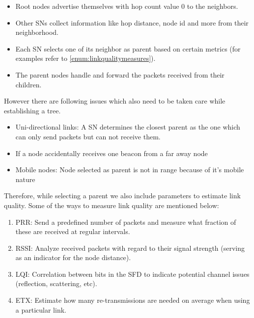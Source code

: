 \begin{itemize}
    \item Root nodes advertise themselves with hop count value 0 to the neighbors.
    \item Other \acp{SN} collect information like hop distance, node id and more from their neighborhood.
    \item Each \ac{SN} selects one of its neighbor as parent based on certain metrics (for examples refer to \ref{enum:linkqualitymeasures}).
    \item The parent nodes handle and forward the packets received from their children.
\end{itemize}

However there are following issues which also need to be taken care while establishing a tree.

\begin{itemize}
    \item Uni-directional links: A \ac{SN} determines the closest parent as the one which can only send packets but can not receive them.
    \item If a node accidentally receives one beacon from a far away node
    \item Mobile nodes: Node selected as parent is not in range because of it's mobile nature
\end{itemize}

Therefore, while selecting a parent we also include parameters to estimate link quality. Some of the ways to measure link quality are mentioned below:

\begin{enumerate}\label{enum:linkqualitymeasures}
    \item \ac{PRR}: Send a predefined number of packets and measure what fraction of these are received at regular intervals.
    
    \item \ac{RSSI}: Analyze received packets with regard to their signal strength (serving as an indicator for the node distance).

    
    \item \ac{LQI}: Correlation between bits in the \ac{SFD} to indicate potential channel issues (reflection, scattering, etc).

    \item \ac{ETX}: Estimate how many re-transmissions are needed on average when using a particular link.
\end{enumerate}

